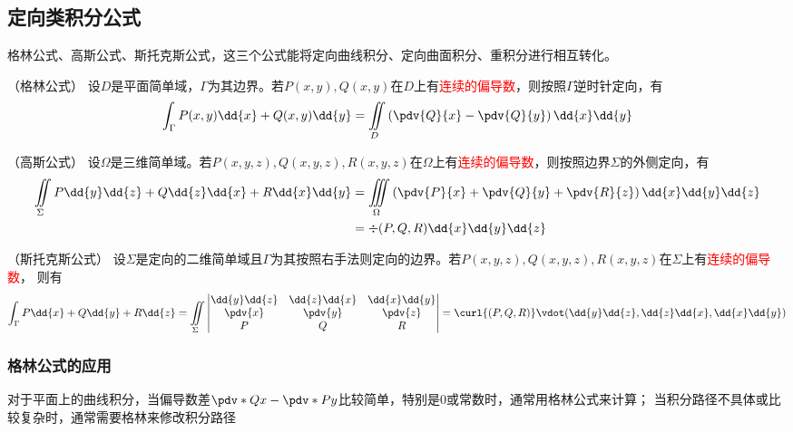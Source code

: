\subsection{定向类积分公式}
格林公式、高斯公式、斯托克斯公式，这三个公式能将定向曲线积分、定向曲面积分、重积分进行相互转化。
\begin{theorem}
    （格林公式）
    \label{th:格林公式}
    设$D$是平面简单域，$\Gamma$为其边界。若$P(x,y),Q(x,y)$在$D$上有\textcolor{red}{连续的偏导数}，则按照$\Gamma$逆时针定向，有
    \[ \int_\Gamma P(x,y)\dd{x} + Q(x,y)\dd{y} = \iint\limits_D \left(\pdv{Q}{x} - \pdv{Q}{y}\right) \dd{x}\dd{y} \]
\end{theorem}
\begin{theorem}
    （高斯公式）
    \label{th:高斯公式}
    设$\Omega$是三维简单域。若$P(x,y,z),Q(x,y,z),R(x,y,z)$在$\Omega$上有\textcolor{red}{连续的偏导数}，则按照边界$\Sigma$的外侧定向，有
    \begin{align*}
        \iint\limits_\Sigma P\dd{y}\dd{z} + Q\dd{z}\dd{x} + R\dd{x}\dd{y}
         & =\iiint\limits_\Omega \left(\pdv{P}{x} + \pdv{Q}{y} + \pdv{R}{z}\right) \dd{x}\dd{y}\dd{z} \\
         & =\div{(P,Q,R)}\dd{x}\dd{y}\dd{z}
    \end{align*}
\end{theorem}
\begin{theorem}
    （斯托克斯公式）
    设$\Sigma$是定向的二维简单域且$\Gamma$为其按照右手法则定向的边界。若$P(x,y,z),Q(x,y,z),R(x,y,z)$在$\Sigma$上有\textcolor{red}{连续的偏导数}，
    则有
    \[
        \int_\Gamma P\dd{x} + Q\dd{y} + R\dd{z}
        =
        \iint\limits_\Sigma
        \begin{vmatrix}
            \dd{y}\dd{z} & \dd{z}\dd{x} & \dd{x}\dd{y} \\
            \pdv{x}      & \pdv{y}      & \pdv{z}      \\
            P            & Q            & R
        \end{vmatrix}
        =\curl{(P,Q,R)}\vdot(\dd{y}\dd{z},\dd{z}\dd{x},\dd{x}\dd{y})
    \]
\end{theorem}

\subsubsection{格林公式的应用}
对于平面上的曲线积分，当偏导数差$\pdv*{Q}{x}-\pdv*{P}{y}$比较简单，特别是$0$或常数时，通常用格林公式来计算；
当积分路径不具体或比较复杂时，通常需要格林来修改积分路径

